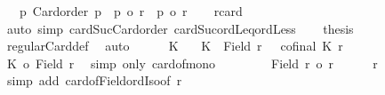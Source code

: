 \begin{isabellebody}
\ \ {\isachardoublequoteopen}{\isacharbang}{\kern0pt}{\isacharbang}{\kern0pt}\ p{\isachardot}{\kern0pt}\ Card{\isacharunderscore}{\kern0pt}order\ p\ {\isasymlongrightarrow}\ {\isacharparenleft}{\kern0pt}p\ {\isasymle}o\ r{\isacharparenright}{\kern0pt}\ {\isacharequal}{\kern0pt}\ {\isacharparenleft}{\kern0pt}p\ {\isacharless}{\kern0pt}o\ {\isacharquery}{\kern0pt}r{\isacharprime}{\kern0pt}{\isacharparenright}{\kern0pt}{\isachardoublequoteclose}\isanewline
\ \ \isamarkupfalse%
\ r{\isacharunderscore}{\kern0pt}card\ \isamarkupfalse%
\ {\isacharparenleft}{\kern0pt}auto\ simp{\isacharcolon}{\kern0pt}\ cardSuc{\isacharunderscore}{\kern0pt}Card{\isacharunderscore}{\kern0pt}order\ cardSuc{\isacharunderscore}{\kern0pt}ordLeq{\isacharunderscore}{\kern0pt}ordLess{\isacharparenright}{\kern0pt}\isanewline
\ \ \isamarkupfalse%
\ {\isacharquery}{\kern0pt}thesis\isanewline
\ \ \isamarkupfalse%
\ regularCard{\isacharunderscore}{\kern0pt}def\ \isamarkupfalse%
\ auto\isanewline
\ \ \ \ \isamarkupfalse%
\ K\ \isamarkupfalse%
\ {}{\isacharcolon}{\kern0pt}\ {\isachardoublequoteopen}K\ {\isasymle}\ Field\ {\isacharquery}{\kern0pt}r{\isacharprime}{\kern0pt}{\isachardoublequoteclose}\ \ {}{\isacharcolon}{\kern0pt}\ {\isachardoublequoteopen}cofinal\ K\ {\isacharquery}{\kern0pt}r{\isacharprime}{\kern0pt}{\isachardoublequoteclose}\isanewline
\ \ \ \ \isamarkupfalse%
\ {\isachardoublequoteopen}{\isacharbar}{\kern0pt}K{\isacharbar}{\kern0pt}\ {\isasymle}o\ {\isacharbar}{\kern0pt}Field\ {\isacharquery}{\kern0pt}r{\isacharprime}{\kern0pt}{\isacharbar}{\kern0pt}{\isachardoublequoteclose}\ \isamarkupfalse%
\ {\isacharparenleft}{\kern0pt}simp\ only{\isacharcolon}{\kern0pt}\ card{\isacharunderscore}{\kern0pt}of{\isacharunderscore}{\kern0pt}mono{}{\isacharparenright}{\kern0pt}\isanewline
\ \ \ \ \isamarkupfalse%
\ \isamarkupfalse%
\ {}{}{\isacharcolon}{\kern0pt}\ {\isachardoublequoteopen}{\isacharbar}{\kern0pt}Field\ {\isacharquery}{\kern0pt}r{\isacharprime}{\kern0pt}{\isacharbar}{\kern0pt}\ {\isacharequal}{\kern0pt}o\ {\isacharquery}{\kern0pt}r{\isacharprime}{\kern0pt}{\isachardoublequoteclose}\isanewline
\ \ \ \ \isamarkupfalse%
\ r{\isacharprime}{\kern0pt}\ \isamarkupfalse%
\ {\isacharparenleft}{\kern0pt}simp\ add{\isacharcolon}{\kern0pt}\ card{\isacharunderscore}{\kern0pt}of{\isacharunderscore}{\kern0pt}Field{\isacharunderscore}{\kern0pt}ordIso{\isacharbrackleft}{\kern0pt}of\ {\isacharquery}{\kern0pt}r{\isacharprime}{\kern0pt}{\isacharbrackright}{\kern0pt}{\isacharparenright}{\kern0pt}\isanewline

\end{isabellebody}
